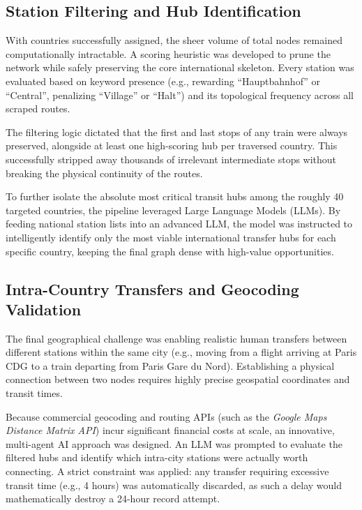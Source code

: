 \subsection{Station Filtering and Hub Identification}
\label{subsec:station_filtering_hub_identification}
With countries successfully assigned, the sheer volume of total nodes remained computationally intractable. A scoring heuristic was developed to prune the network while safely preserving the core international skeleton. Every station was evaluated based on keyword presence (e.g., rewarding ``Hauptbahnhof'' or ``Central'', penalizing ``Village'' or ``Halt'') and its topological frequency across all scraped routes.

The filtering logic dictated that the first and last stops of any train were always preserved, alongside at least one high-scoring hub per traversed country. This successfully stripped away thousands of irrelevant intermediate stops without breaking the physical continuity of the routes.

To further isolate the absolute most critical transit hubs among the roughly 40 targeted countries, the pipeline leveraged Large Language Models (LLMs). By feeding national station lists into an advanced LLM, the model was instructed to intelligently identify only the most viable international transfer hubs for each specific country, keeping the final graph dense with high-value opportunities.

\subsection{Intra-Country Transfers and Geocoding Validation}
\label{subsec:intra_country_transfers_geocoding_validation}
The final geographical challenge was enabling realistic human transfers between different stations within the same city (e.g., moving from a flight arriving at Paris CDG to a train departing from Paris Gare du Nord). Establishing a physical connection between two nodes requires highly precise geospatial coordinates and transit times.

Because commercial geocoding and routing APIs (such as the \textit{Google Maps Distance Matrix API}) incur significant financial costs at scale, an innovative, multi-agent AI approach was designed. An LLM was prompted to evaluate the filtered hubs and identify which intra-city stations were actually worth connecting. A strict constraint was applied: any transfer requiring excessive transit time (e.g., 4 hours) was automatically discarded, as such a delay would mathematically destroy a 24-hour record attempt.

